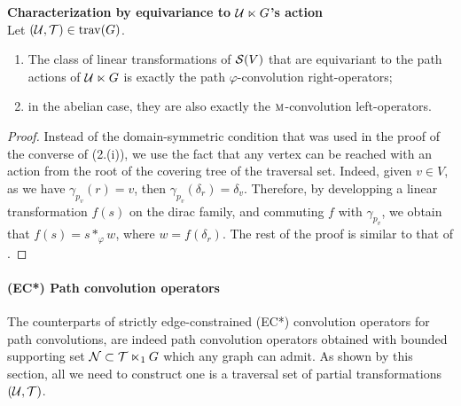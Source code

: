 \begin{proposition}\textbf{Characterization by equivariance to $\mathcal{U} \ltimes G$'s action}\\
Let $(\mathcal{U}, \mathcal{T}) \in \operatorname{trav}(G)$.
\begin{enumerate}[label=(\roman*)]
\item The class of linear transformations of $\mathcal{S}(V)$ that are equivariant to the path actions of $\mathcal{U} \ltimes G$ is exactly the path $\varphi$-convolution right-operators;
\item in the abelian case, they are also exactly the $\operatorname{\textsc{m}}$-convolution left-operators.
\end{enumerate}
\end{proposition}

\begin{proof}
Instead of the domain-symmetric condition that was used in the proof of the converse of  (2.(i)), we use the fact that any vertex can be reached with an action from the root of the covering tree of the traversal set. Indeed, given $v \in V$, as we have $\gamma_{p_v}(r)=v$, then $\gamma_{p_v}(\delta_r) = \delta_v$. Therefore, by developping a linear transformation $f(s)$ on the dirac family, and commuting $f$ with $\gamma_{p_v}$, we obtain that $f(s) = s \ast_\varphi w$, where $w = f(\delta_r)$. The rest of the proof is similar to that of .
\end{proof}

\paragraph{(EC*) Path convolution operators}
The counterparts of strictly edge-constrained (EC*) convolution operators for path convolutions, are indeed path convolution operators obtained with bounded supporting set $\mathcal{N} \subset \mathcal{T} \ltimes_1 G$ which any graph can admit. As shown by this section, all we need to construct one is a traversal set of partial transformations $(\mathcal{U}, \mathcal{T})$.
